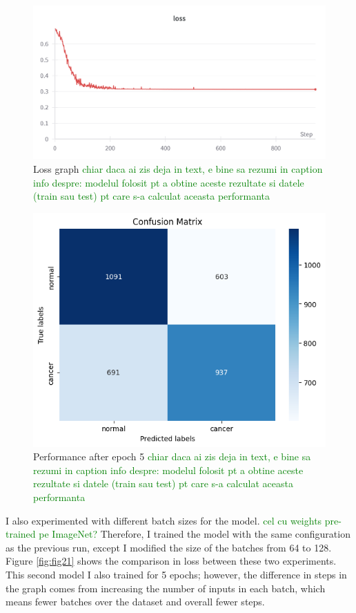 \begin{figure}[!ht]
    \centering
    \includegraphics[width=1\linewidth]{figures/Figure20.png}
    \caption{Loss graph
    \textcolor{green}{chiar daca ai zis deja in text, e bine sa rezumi in caption info despre: modelul folosit pt a obtine aceste rezultate si datele (train sau test) pt care s-a calculat aceasta performanta}
    }
    \label{fig:fig19}
\end{figure}

\begin{figure}[!ht]
    \centering
    \includegraphics[width=0.5\linewidth]{figures/Figure21.png}
    \caption{Performance after epoch 5
    \textcolor{green}{chiar daca ai zis deja in text, e bine sa rezumi in caption info despre: modelul folosit pt a obtine aceste rezultate si datele (train sau test) pt care s-a calculat aceasta performanta}
    }
    \label{fig:fig20}
\end{figure}

I also experimented with different batch sizes for the model.
\textcolor{green}{cel cu weights pre-trained pe ImageNet?}  
Therefore, I trained the model with the same configuration as the previous run, except I modified the size of the batches from 64 to 128. Figure \ref{fig:fig21} shows the comparison in loss between these two experiments. This second model I also trained for 5 epochs; however, the difference in steps in the graph comes from increasing the number of inputs in each batch, which means fewer batches over the dataset and overall fewer steps.

